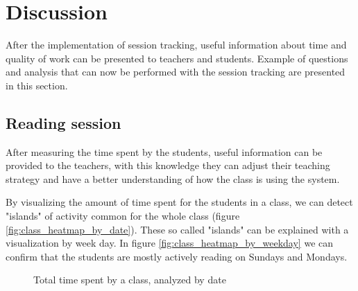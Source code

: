 \chapter{Discussion}
After the implementation of session tracking, useful information about time and quality of work can be presented to teachers and students. Example of questions and analysis that can now be performed with the session tracking are presented in this section.

\section{Reading session}
After measuring the time spent by the students, useful information can be provided to the teachers, with this knowledge they can adjust their teaching strategy and have a better understanding of how the class is using the system.

By visualizing the amount of time spent for the students in a class, we can detect "islands" of activity common for the whole class (figure \ref{fig:class_heatmap_by_date}). These so called "islands" can be explained with a visualization by week day. In figure \ref{fig:class_heatmap_by_weekday} we can confirm that the students are mostly actively reading on Sundays and Mondays.

\begin{figure}[bth]
	\myfloatalign
	 \quad 
	 \quad
	\caption{Total time spent by a class, analyzed by date}
\end{figure}


